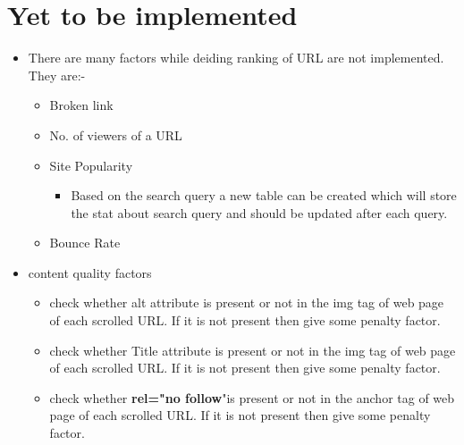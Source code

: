 \documentclass{scrreprt}
\begin{document}
\chapter{Yet to be implemented}
     \begin{itemize}
    \item  There are many factors while deiding ranking of URL are not implemented.
    They are:-
        \begin{itemize}
         \item Broken link 
        \end{itemize}
         \begin{itemize}
         \item No. of viewers of a URL 
        \end{itemize}
         \begin{itemize}
         \item Site Popularity 
              \begin{itemize}
                 \item Based on the search query a new table can be created which will store the stat about search query and should be updated after each query.
               \end{itemize}
        \end{itemize}
          \begin{itemize}
         \item Bounce Rate
        \end{itemize}
     \end{itemize}
    
    \begin{itemize}
         \item content quality factors 
             \begin{itemize}
    \item check whether alt attribute is present or not in the img tag of web page of each scrolled URL. If it is not present then give some penalty factor.
    \end{itemize}
    \begin{itemize}
   \item  check  whether Title attribute is present or not in the  img tag of web page of each scrolled URL. If it is not present then give some penalty factor.
   \end{itemize}
   \begin{itemize}
   \item  check  whether \textbf{rel="no follow}"is present or not in the  anchor tag of web page of each scrolled URL. If it is not present then give some penalty factor.
   \end{itemize}
            
        \end{itemize}
   
  
\end{document}
